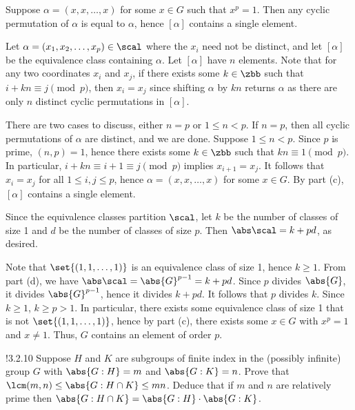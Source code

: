 \begin{solenum}
	\leftimp Suppose $\alpha = (x, x, \dots, x)$ for some $x \in G$ such that $x^p = 1$.
	Then any cyclic permutation of $\alpha$ is equal to $\alpha$, hence $[\alpha]$ contains a single element.
    \item Let $\alpha = (x_1, x_2, \dots, x_p) \in \scal$ where the $x_i$ need not be distinct, and let $[\alpha]$ be the equivalence class containing $\alpha$.
	Let $[\alpha]$ have $n$ elements.
	Note that for any two coordinates $x_i$ and $x_j$, if there exists some $k \in \zbb$ such that $i + kn \equiv j \pmod p$, then $x_i = x_j$ since shifting $\alpha$ by $kn$ returns $\alpha$ as there are only $n$ distinct cyclic permutations in $[\alpha]$.
    
    There are two cases to discuss, either $n = p$ or $1 \leq n < p$.
	If $n = p$, then all cyclic permutations of $\alpha$ are distinct, and we are done.
	Suppose $1 \leq n < p$.
	Since $p$ is prime, $(n, p) = 1$, hence there exists some $k \in \zbb$ such that $kn \equiv 1 \pmod p$.
	In particular, $i + kn \equiv i + 1 \equiv j \pmod p$ implies $x_{i + 1} = x_j$.
	It follows that $x_i = x_j$ for all $1 \leq i, j \leq p$, hence $\alpha = (x, x, \dots, x)$ for some $x \in G$.
	By part (c), $[\alpha]$ contains a single element.

    Since the equivalence classes partition $\scal$, let $k$ be the number of classes of size 1 and $d$ be the number of classes of size $p$.
	Then $\abs\scal = k + pd$, as desired.
    \item Note that $\set{(1, 1, \dots, 1)}$ is an equivalence class of size 1, hence $k \geq 1$.
	From part (d), we have $\abs\scal = \abs{G}^{p-1} = k + pd$.
	Since $p$ divides $\abs{G}$, it divides $\abs{G}^{p-1}$, hence it divides $k + pd$.
	It follows that $p$ divides $k$.
	Since $k \geq 1$, $k \geq p > 1$.
	In particular, there exists some equivalence class of size 1 that is not $\set{(1, 1, \dots, 1)}$, hence by part (c), there exists some $x \in G$ with $x^p = 1$ and $x \neq 1$.
	Thus, $G$ contains an element of order $p$.
\end{solenum}

\begin{exercise}!{3.2.10}
    Suppose $H$ and $K$ are subgroups of finite index in the (possibly infinite) group $G$ with $\abs{G : H} = m$ and $\abs{G : K} = n$.
	Prove that $\lcm(m, n) \leq \abs{G : H \cap K} \leq mn$.
	Deduce that if $m$ and $n$ are relatively prime then $\abs{G : H \cap K} = \abs{G : H} \cdot \abs{G : K}$.
\end{exercise}

